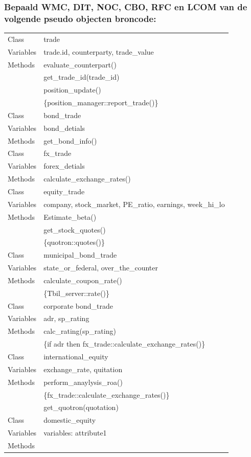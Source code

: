 \documentclass[a4paper,titlepage]{artikel1}
\begin{document}
   \subsubsection[Opdracht 2]{Bepaald WMC, DIT, NOC, CBO, RFC en LCOM van de volgende pseudo objecten broncode:}
   \begin{tabular}[t]{|l|l|}
     \hline
     Class & trade \\
     Variables & trade.id, counterparty, trade\_value \\
     Methods & evaluate\_counterpart() \\
     & get\_trade\_id(trade\_id) \\
     & position\_update() \\
     & \{position\_manager::report\_trade()\} \\
     \hline
     Class & bond\_trade \\
     Variables & bond\_detials \\
     Methods & get\_bond\_info() \\
     \hline
     Class & fx\_trade \\
     Variables & forex\_detials \\
     Methods & calculate\_exchange\_rates() \\
     \hline
     Class & equity\_trade \\
     Variables & company, stock\_market, PE\_ratio,  earnings, week\_hi\_lo \\
     Methods & Estimate\_beta() \\
     & get\_stock\_quotes() \\
     & \{quotron::quotes()\} \\
     \hline
     Class &municipal\_bond\_trade \\
     Variables & state\_or\_federal, over\_the\_counter \\
     Methods & calculate\_coupon\_rate() \\
     & \{Tbil\_server::rate()\} \\
     \hline
     Class & corporate bond\_trade \\
     Variables & adr, sp\_rating \\
     Methods & calc\_rating(sp\_rating) \\
     & \{if adr then fx\_trade::calculate\_exchange\_rates()\} \\
     \hline
     Class & international\_equity \\
     Variables & exchange\_rate, quitation \\
     Methods & perform\_anaylysis\_roa()\\
     & \{fx\_trade::calculate\_exchange\_rates()\}\\
     & get\_quotron(quotation) \\
     \hline
     Class & domestic\_equity \\
     Variables & variables: attribute1\\
     Methods & \\
     \hline
   \end{tabular}
\end{document}
